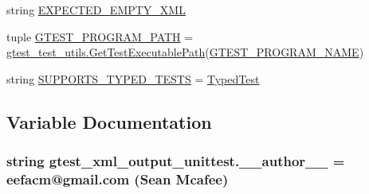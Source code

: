 \begin{DoxyCompactItemize}
\item 
string \hyperlink{namespacegtest__xml__output__unittest_abe1569d019b037f006986004349c7cf3}{E\+X\+P\+E\+C\+T\+E\+D\+\_\+\+E\+M\+P\+T\+Y\+\_\+\+X\+M\+L}
\item 
tuple \hyperlink{namespacegtest__xml__output__unittest_a775ae6280a8c718f2cb0e0a9bad07f2b}{G\+T\+E\+S\+T\+\_\+\+P\+R\+O\+G\+R\+A\+M\+\_\+\+P\+A\+T\+H} = \hyperlink{namespacegtest__test__utils_a1bdf3cac86afa675ed37629b183048e9}{gtest\+\_\+test\+\_\+utils.\+Get\+Test\+Executable\+Path}(\hyperlink{namespacegtest__xml__output__unittest_ab89cc5b402310ef67bcaf38fa5017461}{G\+T\+E\+S\+T\+\_\+\+P\+R\+O\+G\+R\+A\+M\+\_\+\+N\+A\+M\+E})
\item 
string \hyperlink{namespacegtest__xml__output__unittest_a07eecd027d660022c0ab447f3c3e0f2e}{S\+U\+P\+P\+O\+R\+T\+S\+\_\+\+T\+Y\+P\+E\+D\+\_\+\+T\+E\+S\+T\+S} = \textquotesingle{}\hyperlink{class_typed_test}{Typed\+Test}\textquotesingle{}
\end{DoxyCompactItemize}


\subsection{Variable Documentation}
\hypertarget{namespacegtest__xml__output__unittest_a14db59ae462df049de11ee863be54f09}{}
\subsubsection[{\+\_\+\+\_\+author\+\_\+\+\_\+}]{\setlength{\rightskip}{0pt plus 5cm}string gtest\+\_\+xml\+\_\+output\+\_\+unittest.\+\_\+\+\_\+author\+\_\+\+\_\+ = \textquotesingle{}eefacm@gmail.\+com (Sean Mcafee)\textquotesingle{}}\label{namespacegtest__xml__output__unittest_a14db59ae462df049de11ee863be54f09}
\hypertarget{namespacegtest__xml__output__unittest_abe1569d019b037f006986004349c7cf3}{}
